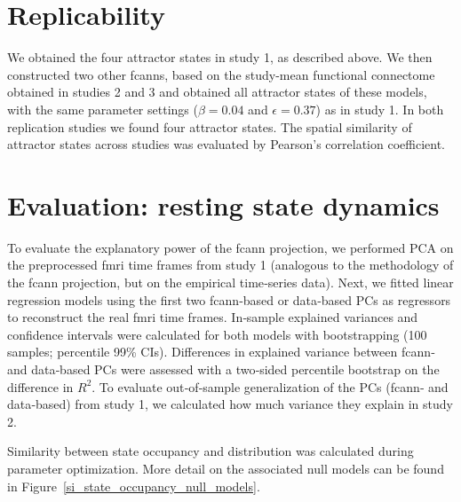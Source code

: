 \documentclass{article}
\begin{document}
\section{Replicability}

We obtained the four attractor states in study 1, as described above. We then constructed two other \acrshort{fcann}s, based on the study-mean functional connectome obtained in studies 2 and 3 and  obtained all attractor states of these models, with the same parameter settings ($\beta = 0.04$ and $\epsilon = 0.37$) as in study 1. In both replication studies we found four attractor states. The spatial similarity of attractor states across studies was evaluated by Pearson's correlation coefficient.

\section{Evaluation: resting state dynamics}

To evaluate the explanatory power of the \acrshort{fcann} projection, we performed PCA on the preprocessed \acrshort{fmri} time frames from study 1 (analogous to the methodology of the \acrshort{fcann} projection, but on the empirical time‑series data).
Next, we fitted linear regression models using the first two \acrshort{fcann}‑based or data‑based PCs as regressors to reconstruct the real \acrshort{fmri} time frames. In‑sample explained variances and confidence intervals were calculated for both models with bootstrapping (100 samples; percentile 99\% CIs). Differences in explained variance between \acrshort{fcann}‑ and data‑based PCs were assessed with a two‑sided percentile bootstrap on the difference in $R^2$. To evaluate out‑of‑sample generalization of the PCs (\acrshort{fcann}‑ and data‑based) from study 1, we calculated how much variance they explain in study 2.

Similarity between state occupancy and distribution was calculated during parameter optimization. More detail on the associated null models can be found in Figure~\ref{si_state_occupancy_null_models}.
\end{document}
